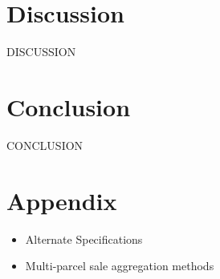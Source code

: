 \documentclass[12pt]{article}
\begin{document}
\newpage

\section{Discussion}

DISCUSSION

\newpage

\section{Conclusion}

CONCLUSION

\newpage

\section{Appendix}

\begin{itemize}
    \item Alternate Specifications
    \item Multi-parcel sale aggregation methods
\end{itemize}


\newpage


\printbibliography
\end{document}
